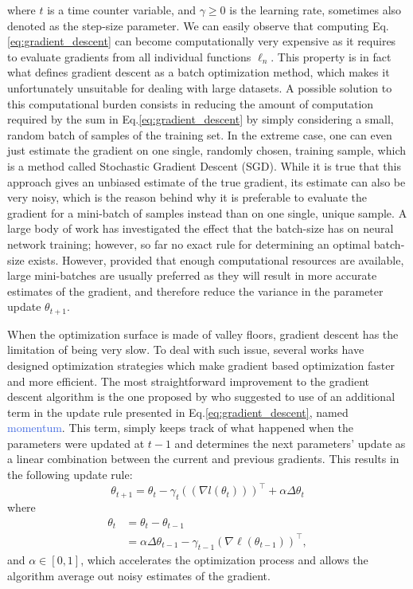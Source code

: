 where $t$ is a time counter variable, and $\gamma\geq0$ is the learning rate, sometimes also denoted as the step-size parameter. We can easily observe that computing Eq. \ref{eq:gradient_descent} can become computationally very expensive as it requires to evaluate gradients from all individual functions $\ell_n$. This property is in fact what defines gradient descent as a batch optimization method, which makes it unfortunately unsuitable for dealing with large datasets. A possible solution to this computational burden consists in reducing the amount of computation required by the sum in Eq.\ref{eq:gradient_descent} by simply considering a small, random batch of samples of the training set. In the extreme case, one can even just estimate the gradient on one single, randomly chosen, training sample, which is a method called Stochastic Gradient Descent (SGD). While it is true that this approach gives an unbiased estimate of the true gradient, its estimate can also be very noisy, which is the reason behind why it is preferable to evaluate the gradient for a mini-batch of samples instead than on one single, unique sample. A large body of work has investigated the effect that the batch-size has on neural network training; however, so far no exact rule for determining an optimal batch-size exists. However, provided that enough computational resources are available, large mini-batches are usually preferred as they will result in more accurate estimates of the gradient, and therefore reduce the variance in the parameter update $\theta_{t+1}$. 

When the optimization surface is made of valley floors, gradient descent has the limitation of being very slow. To deal with such issue, several works have designed optimization strategies which make gradient based optimization faster and more efficient. The most straightforward improvement to the gradient descent algorithm is the one proposed by \citet{rumelhart1986learning} who suggested to use of an additional term in the update rule presented in Eq.\ref{eq:gradient_descent}, named \textcolor{RoyalBlue}{momentum}. This term, simply keeps track of what happened when the parameters were updated at $t-1$ and determines the next parameters' update as a linear combination between the current and previous gradients. This results in the following update rule:
\begin{equation}
	\theta_{t+1} = \theta_t - \gamma_t ((\nabla l(\theta_t)))^{\intercal} + \alpha\Delta\theta_t
	\label{eq: momentum}
\end{equation}
where  
\begin{align}
	\theta_{t} & = \theta_t - \theta_{t-1} \\ 
		   & = \alpha\Delta\theta_{t-1}-\gamma_{t-1}(\nabla \ell(\theta_{t-1}))^{\intercal},
	\label{eq:gradient_descent}
\end{align}
and $\alpha\in[0,1]$, which accelerates the optimization process and allows the algorithm average out noisy estimates of the gradient.

